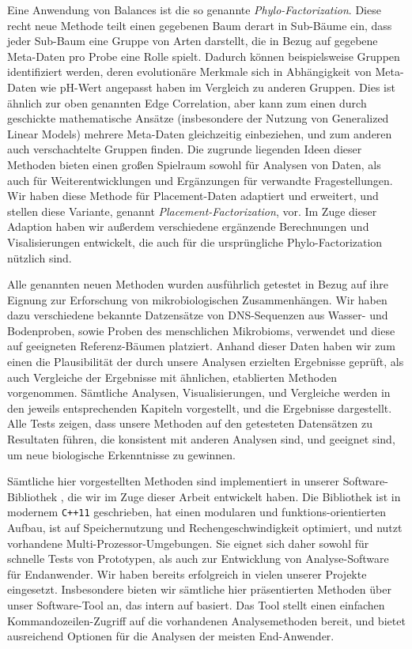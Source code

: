 Eine Anwendung von Balances ist die so genannte \emph{Phylo-Factorization}.
Diese recht neue Methode teilt einen gegebenen Baum derart in Sub-B\"aume ein,
dass jeder Sub-Baum eine Gruppe von Arten darstellt, die in Bezug auf gegebene Meta-Daten pro Probe eine Rolle spielt.
Dadurch k\"onnen beispielsweise Gruppen identifiziert werden,
deren evolution\"are Merkmale sich in Abh\"angigkeit von Meta-Daten wie pH-Wert angepasst haben im Vergleich zu anderen Gruppen.
Dies ist \"ahnlich zur oben genannten Edge Correlation, aber kann zum einen durch geschickte mathematische Ans\"atze
(insbesondere der Nutzung von Generalized Linear Models)
mehrere Meta-Daten gleichzeitig einbeziehen, und zum anderen auch verschachtelte Gruppen finden.
Die zugrunde liegenden Ideen dieser Methoden bieten einen gro\ss{}en Spielraum sowohl f\"ur Analysen von Daten,
als auch f\"ur Weiterentwicklungen und Erg\"anzungen f\"ur verwandte Fragestellungen.
Wir haben diese Methode f\"ur Placement-Daten adaptiert und erweitert,
und stellen diese Variante, genannt \emph{Placement-Factorization}, vor.
Im Zuge dieser Adaption haben wir au\ss{}erdem verschiedene erg\"anzende Berechnungen und Visalisierungen entwickelt,
die auch f\"ur die urspr\"ungliche Phylo-Factorization n\"utzlich sind.

Alle genannten neuen Methoden wurden ausf\"uhrlich getestet
in Bezug auf ihre Eignung zur Erforschung von mikrobiologischen Zusammenh\"angen.
Wir haben dazu verschiedene bekannte Datzens\"atze von DNS-Sequenzen aus Wasser- und Bodenproben,
sowie Proben des menschlichen Mikrobioms, verwendet und
diese auf geeigneten Referenz-B\"aumen platziert.
Anhand dieser Daten haben wir zum einen die Plausibilit\"at der durch unsere Analysen erzielten Ergebnisse gepr\"uft,
als auch Vergleiche der Ergebnisse mit \"ahnlichen, etablierten Methoden vorgenommen.
S\"amtliche Analysen, Visualisierungen, und Vergleiche werden in den jeweils entsprechenden Kapiteln
vorgestellt, und die Ergebnisse dargestellt.
Alle Tests zeigen, dass unsere Methoden auf den getesteten Datens\"atzen zu Resultaten f\"uhren,
die konsistent mit anderen Analysen sind, und geeignet sind, um neue biologische Erkenntnisse zu gewinnen.

S\"amtliche hier vorgestellten Methoden sind implementiert in unserer Software-Biblio\-thek ,
die wir im Zuge dieser Arbeit entwickelt haben.
Die Bibliothek ist in modernem \texttt{C++11} geschrieben, hat einen modularen und funktions-orientierten Aufbau,
ist auf Speichernutzung und Rechengeschwindigkeit optimiert, und nutzt vorhandene Multi-Prozessor-Umgebungen.
Sie eignet sich daher sowohl f\"ur schnelle Tests von Prototypen,
als auch zur Entwicklung von Analyse-Software f\"ur Endanwender.
Wir haben  bereits erfolgreich in vielen unserer Projekte eingesetzt.
Insbesondere bieten wir s\"amtliche hier pr\"asentierten Methoden \"uber unser Software-Tool  an,
das intern auf  basiert.
Das Tool stellt einen einfachen Kommandozeilen-Zugriff auf die vorhandenen Analysemethoden bereit,
und bietet ausreichend Optionen f\"ur die Analysen der meisten End-Anwender.

